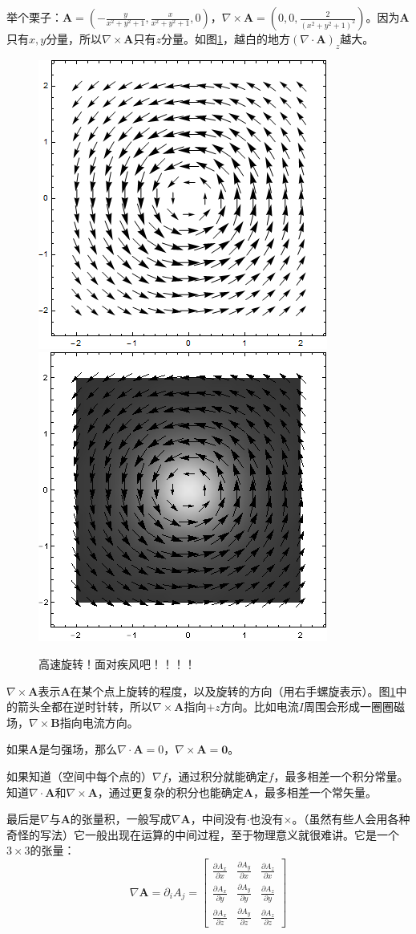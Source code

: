 举个栗子：$\mathbf{A}=(-\frac{y}{x^2+y^2+1},\frac{x}{x^2+y^2+1},0)$，$\nabla \times \mathbf{A}=(0,0,\frac{2}{(x^2+y^2+1)^2})$。因为$\mathbf{A}$只有$x,y$分量，所以$\nabla \times \mathbf{A}$只有$z$分量。如图\ref{fig-vec-curl}，越白的地方$(\nabla \cdot \mathbf{A})_z$越大。
\begin{figure}[htb]
\centering
\includegraphics[width=0.33\linewidth]{fig/vec-curl.png}
\includegraphics[width=0.33\linewidth]{fig/vec-curl-2.png}
\caption{高速旋转！面对疾风吧！！！！}
\label{fig-vec-curl}
\end{figure}

$\nabla \times \mathbf{A}$表示$\mathbf{A}$在某个点上旋转的程度，以及旋转的方向（用右手螺旋表示）。图\ref{fig-vec-curl}中的箭头全都在逆时针转，所以$\nabla \times \mathbf{A}$指向$+z$方向。比如电流$I$周围会形成一圈圈磁场，$\nabla \times \mathbf{B}$指向电流方向。

如果$\mathbf{A}$是匀强场，那么$\nabla \cdot \mathbf{A}=0$，$\nabla \times \mathbf{A}=\mathbf{0}$。

如果知道（空间中每个点的）$\nabla f$，通过积分就能确定$f$，最多相差一个积分常量。知道$\nabla \cdot \mathbf{A}$和$\nabla \times \mathbf{A}$，通过更复杂的积分也能确定$\mathbf{A}$，最多相差一个常矢量。

最后是$\nabla$与$\mathbf{A}$的张量积，一般写成$\nabla \mathbf{A}$，中间没有$\cdot$也没有$\times$。（虽然有些人会用各种奇怪的写法）它一般出现在运算的中间过程，至于物理意义就很难讲。它是一个$3 \times 3$的张量：
\begin{equation}
\nabla \mathbf{A}=\partial_i A_j=\begin{bmatrix}
\frac{\partial A_x}{\partial x} & \frac{\partial A_y}{\partial x} & \frac{\partial A_z}{\partial x} \\
\frac{\partial A_x}{\partial y} & \frac{\partial A_y}{\partial y} & \frac{\partial A_z}{\partial y} \\
\frac{\partial A_x}{\partial z} & \frac{\partial A_y}{\partial z} & \frac{\partial A_z}{\partial z}
\end{bmatrix}
\end{equation}

